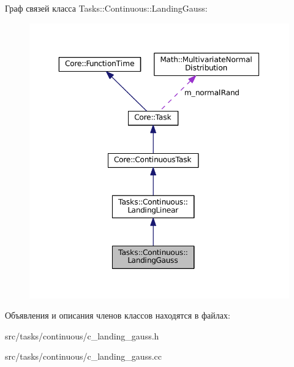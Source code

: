 Граф связей класса Tasks\+:\+:Continuous\+:\+:Landing\+Gauss\+:
\nopagebreak
\begin{figure}[H]
\begin{center}
\leavevmode
\includegraphics[width=350pt]{class_tasks_1_1_continuous_1_1_landing_gauss__coll__graph}
\end{center}
\end{figure}


Объявления и описания членов классов находятся в файлах\+:\begin{DoxyCompactItemize}
\item 
src/tasks/continuous/c\+\_\+landing\+\_\+gauss.\+h\item 
src/tasks/continuous/c\+\_\+landing\+\_\+gauss.\+cc\end{DoxyCompactItemize}
